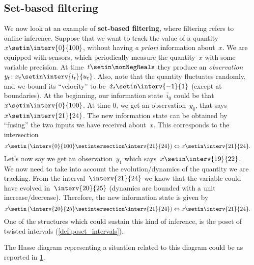 \subsection{Set-based filtering}
We now look at an example of \textbf{set-based filtering}, where filtering refers to online inference.
Suppose that we want to track the value of a quantity~$x\setin \interv{0}{100}$, without having \emph{a priori} information about~$x$.
We are equipped with sensors, which periodically measure the quantity~$x$ with some variable precision.
At time~$t\setin \nonNegReals$ they produce an \emph{observation}~$y_t\colon x_t\setin \interv{l_t}{u_t}$.
Also, note that the quantity fluctuates randomly, and we bound its ``velocity'' to be~$\dot{x}_t\setin \interv{-1}{1}$ (except at boundaries).
At the beginning, our information state~$\bar{i}_0$ could be that~$x\setin \interv{0}{100}$.
At time 0, we get an observation~$y_0$, that says~$x\setin \interv{21}{24}$.
The new information state can be obtained by ``fusing'' the two inputs we have received about~$x$.
This corresponds to the intersection
\begin{equation*}
    x\setin \left( \interv{0}{100} \setintersection \interv{21}{24}\right)\Leftrightarrow x\setin \interv{21}{24}.
\end{equation*}
Let's now say we get an observation~$y_1$ which says~$x\setin \interv{19}{22}$.
We now need to take into account the evolution/dynamics of the quantity we are tracking.
From the interval~$\interv{21}{24}$ we know that the variable could have evolved in~$\interv{20}{25}$ (dynamics are bounded with a unit increase/decrease).
Therefore, the new information state is given by
\begin{equation*}
    x\setin \left( \interv{20}{25} \setintersection \interv{21}{24}\right)\Leftrightarrow x\setin \interv{21}{24}.
\end{equation*}
One of the structures which could sustain this kind of inference, is the poset of twisted intervals  (\cref{def:poset_intervals}).

The Hasse diagram representing a situation related to this diagram could be as reported in \cref{fig:hasse_filtering}.
\begin{figure}[h!]
    \centering
    \caption{}
    \label{fig:hasse_filtering}
\end{figure}
